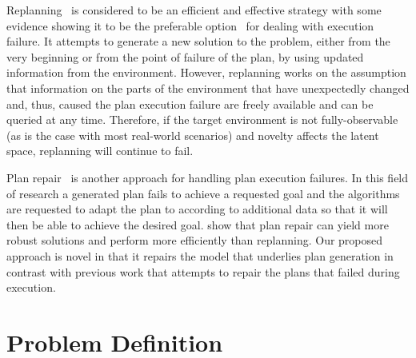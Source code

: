\documentclass[letterpaper]{article} %
\begin{document}
Replanning~\cite{cushing2005replanning, bezrucav2022towards} is considered to be an efficient and effective strategy with some evidence showing it to be the preferable option~\cite{nebel1995plan} for dealing with execution failure. It attempts to generate a new solution to the problem, either from the very beginning or from the point of failure of the plan, by using updated information from the environment. However, replanning works on the assumption that information on the parts of the environment that have unexpectedly changed and, thus, caused the plan execution failure are freely available and can be queried at any time. Therefore, if the target environment is not fully-observable (as is the case with most real-world scenarios) and novelty affects the latent space, replanning will continue to fail.

Plan repair~\cite{myers1999cpef, bidot2008plan, komenda2014domain} is another approach for handling plan execution failures. In this field of research a generated plan fails to achieve a requested goal and the algorithms are requested to adapt the plan to according to additional data so that it will then be able to achieve the desired goal. \cite{fox2006plan} show that plan repair can yield more robust solutions and perform more efficiently than replanning.
Our proposed approach is novel in that it repairs the model that underlies plan generation in contrast with previous work that attempts to repair the plans that failed during execution.  



\section{Problem Definition}
\end{document}
